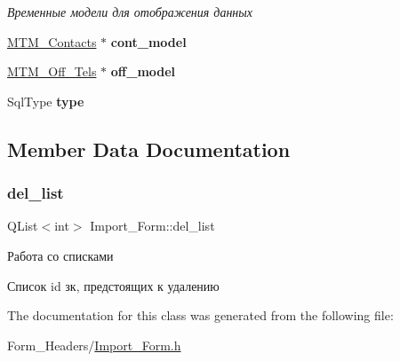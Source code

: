 \begin{DoxyCompactItemize}
\begin{DoxyCompactList}\small\item\em Временные модели для отображения данных \end{DoxyCompactList}\item 
\mbox{\label{class_import___form_a1c23b15f3b5516de7d48a683d7e7c42f}} 
\mbox{\hyperlink{class_m_t_m___contacts}{M\+T\+M\+\_\+\+Contacts}} $\ast$ {\bfseries cont\+\_\+model}
\item 
\mbox{\label{class_import___form_ade8da6a24b5543034a551d2e2875c1d9}} 
\mbox{\hyperlink{class_m_t_m___off___tels}{M\+T\+M\+\_\+\+Off\+\_\+\+Tels}} $\ast$ {\bfseries off\+\_\+model}
\item 
\mbox{\label{class_import___form_afa9030064f24d46b833548ce1cf5972d}} 
Sql\+Type {\bfseries type}
\end{DoxyCompactItemize}


\subsection{Member Data Documentation}
\mbox{\label{class_import___form_a392ce459627fa3029413da7c99bb470a}} 
\subsubsection{\texorpdfstring{del\_list}{del\_list}}
{\footnotesize\ttfamily Q\+List$<$int$>$ Import\+\_\+\+Form\+::del\+\_\+list}



Работа со списками 

Список id зк, предстоящих к удалению 

The documentation for this class was generated from the following file\+:\begin{DoxyCompactItemize}
\item 
Form\+\_\+\+Headers/\mbox{\hyperlink{_import___form_8h}{Import\+\_\+\+Form.\+h}}\end{DoxyCompactItemize}
